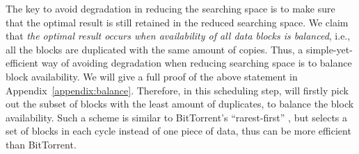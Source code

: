 The key to avoid degradation in reducing the searching space is to make sure that the optimal result is still retained in the reduced searching space.
We claim that {\em the optimal result occurs when availability of all data blocks is balanced}, i.e., all the blocks are duplicated with the same amount of copies. Thus, a simple-yet-efficient way of avoiding degradation when reducing searching space is to balance block availability. We will give a full proof of the above statement in Appendix~\Section\ref{appendix:balance}.
Therefore, in this scheduling step, \name will firstly pick out the subset of blocks with the least amount of duplicates, to balance the block availability. Such a scheme is similar to BitTorrent's ``rarest-first'' \cite{Cohen2003Incentives}, but \name selects a set of blocks in each cycle instead of one piece of data, thus can be more efficient than BitTorrent.


